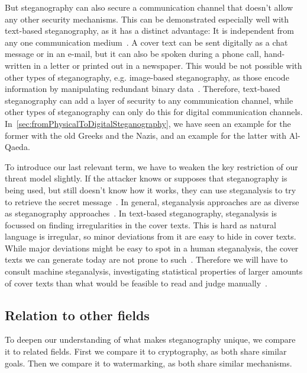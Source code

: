 But steganography can also secure a communication channel that doesn't allow any other security mechanisms. This can be demonstrated especially well with text-based steganography, as it has a distinct advantage: It is independent from any one communication medium~\cite{zieglerNeuralLinguisticSteganography2019}. A cover text can be sent digitally as a chat message or in an e-mail, but it can also be spoken during a phone call, hand-written in a letter or printed out in a newspaper. This would be not possible with other types of steganography, e.g. image-based steganography, as those encode information by manipulating redundant binary data~\cite{bennettLinguisticSteganographySurvey2004}. Therefore, text-based steganography can add a layer of security to any communication channel, while other types of steganography can only do this for digital communication channels. In~\cref{sec:fromPhysicalToDigitalSteganography}, we have seen an example for the former with the old Greeks and the Nazis, and an example for the latter with Al-Qaeda.

To introduce our last relevant term, we have to weaken the key restriction of our threat model slightly. If the attacker knows or supposes that steganography is being used, but still doesn't know how it works, they can use steganalysis to try to retrieve the secret message~\cite{bennettLinguisticSteganographySurvey2004}. In general, steganalysis approaches are as diverse as steganography approaches~\cite{bennettLinguisticSteganographySurvey2004}. In text-based steganography, steganalysis is focussed on finding irregularities in the cover texts. This is hard as natural language is irregular, so minor deviations from it are easy to hide in cover texts. While major deviations might be easy to spot in a human steganalysis, the cover texts we can generate today are not prone to such~\cite{wuGenerativeTextSteganography2024}. Therefore we will have to consult machine steganalysis, investigating statistical properties of larger amounts of cover texts than what would be feasible to read and judge manually~\cite{yangSeSyLinguisticSteganalysis2022,wuGenerativeTextSteganography2024}.

\subsection{Relation to other fields}
\label{sec:relationToOtherFields}
To deepen our understanding of what makes steganography unique, we compare it to related fields. First we compare it to cryptography, as both share similar goals. Then we compare it to watermarking, as both share similar mechanisms.

